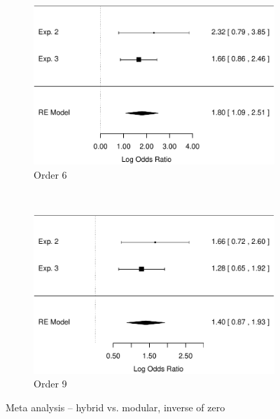 \documentclass[man,10pt]{apa6}
\begin{document}
\begin{figure}
\centering
\begin{subfigure}[c]{0.4\textwidth}
\centering
\includegraphics[width=\textwidth]{figures/meta/question_typeinverse_zero_6_conditionhybrid.pdf}
\caption{Order 6}
\end{subfigure}
~
\begin{subfigure}[c]{0.4\textwidth}
\centering
\includegraphics[width=\textwidth]{figures/meta/question_typeinverse_zero_9_conditionhybrid.pdf}
\caption{Order 9}
\end{subfigure}
\caption{Meta analysis -- hybrid vs. modular, inverse of zero}
\label{meta_inZ_h}
\end{figure}\noindent 
\end{document}
